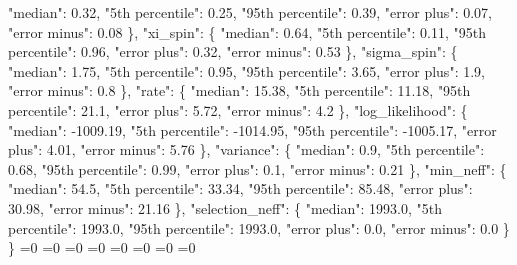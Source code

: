 {{        "median": 0.32, %
        "5th percentile": 0.25, %
        "95th percentile": 0.39, %
        "error plus": 0.07, %
        "error minus": 0.08%
      \}, %
      "xi\_spin": \{%
        "median": 0.64, %
        "5th percentile": 0.11, %
        "95th percentile": 0.96, %
        "error plus": 0.32, %
        "error minus": 0.53%
      \}, %
      "sigma\_spin": \{%
        "median": 1.75, %
        "5th percentile": 0.95, %
        "95th percentile": 3.65, %
        "error plus": 1.9, %
        "error minus": 0.8%
      \}, %
      "rate": \{%
        "median": 15.38, %
        "5th percentile": 11.18, %
        "95th percentile": 21.1, %
        "error plus": 5.72, %
        "error minus": 4.2%
      \}, %
      "log\_likelihood": \{%
        "median": {-}1009.19, %
        "5th percentile": {-}1014.95, %
        "95th percentile": {-}1005.17, %
        "error plus": 4.01, %
        "error minus": 5.76%
      \}, %
      "variance": \{%
        "median": 0.9, %
        "5th percentile": 0.68, %
        "95th percentile": 0.99, %
        "error plus": 0.1, %
        "error minus": 0.21%
      \}, %
      "min\_neff": \{%
        "median": 54.5, %
        "5th percentile": 33.34, %
        "95th percentile": 85.48, %
        "error plus": 30.98, %
        "error minus": 21.16%
      \}, %
      "selection\_neff": \{%
        "median": 1993.0, %
        "5th percentile": 1993.0, %
        "95th percentile": 1993.0, %
        "error plus": 0.0, %
        "error minus": 0.0%
      \}%
    \}}%
  \else%
    \ifnum{}=0%
      \let\MagTruncnormIidTiltIsotropicAlignedNid@I@out\MagTruncnormIidTiltIsotropicAlignedNid@III%
    \else%
      \ifnum{}=0%
      \let\MagTruncnormIidTiltIsotropicAlignedNid@I@out\MagTruncnormIidTiltIsotropicAlignedNid@IV%
    \else%
      \ifnum{}=0%
      \let\MagTruncnormIidTiltIsotropicAlignedNid@I@out\MagTruncnormIidTiltIsotropicAlignedNid@V%
    \else%
      \ifnum{}=0%
      \let\MagTruncnormIidTiltIsotropicAlignedNid@I@out\MagTruncnormIidTiltIsotropicAlignedNid@VI%
    \else%
      \ifnum{}=0%
      \let\MagTruncnormIidTiltIsotropicAlignedNid@I@out\MagTruncnormIidTiltIsotropicAlignedNid@VII%
    \else%
      \ifnum{}=0%
      \let\MagTruncnormIidTiltIsotropicAlignedNid@I@out\MagTruncnormIidTiltIsotropicAlignedNid@VIII%
    \else%
      \ifnum{}=0%
      \let\MagTruncnormIidTiltIsotropicAlignedNid@I@out\MagTruncnormIidTiltIsotropicAlignedNid@IX%
    \else%
      \ifnum{}=0%
}
